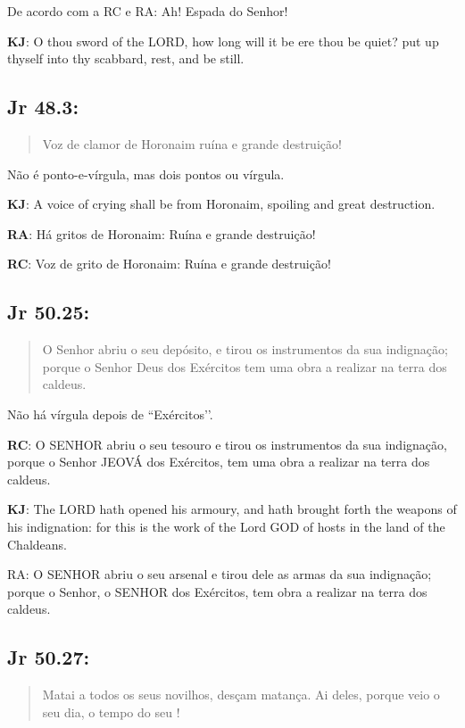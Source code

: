De acordo com a RC e RA: Ah! Espada do Senhor!

\textbf{KJ}: O thou sword of the LORD, how long will it be ere thou be quiet? put up thyself into thy scabbard, rest, and be still.

\subsection*{Jr 48.3:} 
 \begin{quote}
  \small
 Voz de clamor de Horonaim\uwave{;} ruína e grande destruição!
 \end{quote}

Não é ponto-e-vírgula, mas dois pontos ou vírgula.

\textbf{KJ}: A voice of crying shall be from Horonaim, spoiling and great destruction.

\textbf{RA}: Há gritos de Horonaim: Ruína e grande destruição!

\textbf{RC}: Voz de grito de Horonaim: Ruína e grande destruição!

\subsection*{Jr 50.25:} 
 \begin{quote}
  \small
 O Senhor abriu o seu depósito, e tirou os instrumentos da sua indignação; porque o Senhor Deus dos Exércitos\uwave{,} tem uma obra a realizar na terra dos caldeus.
 \end{quote}

Não há vírgula depois de ``Exércitos’’.

\textbf{RC}: O SENHOR abriu o seu tesouro e tirou os instrumentos da sua indignação, porque o Senhor JEOVÁ dos Exércitos, tem uma obra a realizar na terra dos caldeus.

\textbf{KJ}: The LORD hath opened his armoury, and hath brought forth the weapons of his indignation: for this is the work of the Lord GOD of hosts in the land of the Chaldeans.

RA: O SENHOR abriu o seu arsenal e tirou dele as armas da sua indignação; porque o Senhor, o SENHOR dos Exércitos, tem obra a realizar na terra dos caldeus.

\subsection*{Jr 50.27:} 
 \begin{quote}
  \small
 Matai a todos os seus novilhos, desçam  matança. Ai deles, porque veio o seu dia, o tempo do seu !
 \end{quote}

